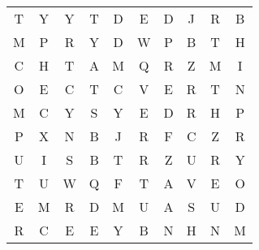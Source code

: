 \documentclass{standalone}
\begin{document}
\begin{center}
\renewcommand{\arraystretch}{1.5}{
\noindent\begin{tabular}{cccccccccc}T & Y & Y & T & D & E & D & J & R & B \\ 
M & P & R & Y & D & W & P & B & T & H \\ 
C & H & T & A & M & Q & R & Z & M & I \\ 
O & E & C & T & C & V & E & R & T & N \\ 
M & C & Y & S & Y & E & D & R & H & P \\ 
P & X & N & B & J & R & F & C & Z & R \\ 
U & I & S & B & T & R & Z & U & R & Y \\ 
T & U & W & Q & F & T & A & V & E & O \\ 
E & M & R & D & M & U & A & S & U & D \\ 
R & C & E & E & Y & B & N & H & N & M
\end{tabular}
}
\end{center}
\end{document}

